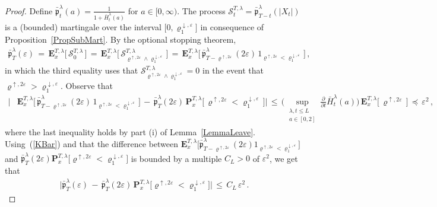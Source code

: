 \documentclass[10pt]{article}
\numberwithin{equation}{section}
\theoremstyle{definition}
\begin{document}
\begin{proof}
Define   $\bar{\mathfrak{p}}_t^{\lambda}(a)=\frac{1}{1+ \bar{H}^{\lambda}_t(a)  }$ for $a\in [0,\infty)$.
  The process $\mathcal{S}^{T,\lambda}_t=\bar{\mathfrak{p}}^{\lambda}_{T-t}(|X_t|)$ is a (bounded)  martingale over the interval $\big[0,\varrho^{\downarrow, \varepsilon}_1 \big]$ in consequence of Proposition~\ref{PropSubMart}.   By the optional stopping theorem,
\begin{align}\label{KBar}
 \bar{\mathfrak{p}}_T^{\lambda}(\varepsilon )  \,=\,  \mathbf{E}^{T,\lambda }_x\Big[\,\mathcal{S}^{T,\lambda}_0\,\Big]\, =\,\mathbf{E}^{T,\lambda }_x\Big[\,\mathcal{S}^{T,\lambda}_{ \varrho^{\uparrow, 2\varepsilon}\wedge \varrho^{\downarrow, \varepsilon}_1  }\,\Big]\,=\,\mathbf{E}^{T,\lambda }_x\Big[\,\bar{\mathfrak{p}}_{T-  \varrho^{\uparrow, 2\varepsilon}}^{\lambda}(2\varepsilon )\, 1_{ \varrho^{\uparrow, 2\varepsilon}<\varrho^{\downarrow, \varepsilon}_1}\, \Big]\,,
\end{align}
in which the third equality uses that $\mathcal{S}^{T,\lambda}_{ \varrho^{\uparrow, 2\varepsilon}\wedge \varrho^{\downarrow, \varepsilon}_1  }=0$ in the event that $\varrho^{\uparrow, 2\varepsilon}>\varrho^{\downarrow, \varepsilon}_1$.  Observe that 
\begin{align*}
    \bigg| & \mathbf{E}^{T,\lambda }_x\Big[\,\bar{\mathfrak{p}}_{T-  \varrho^{\uparrow, 2\varepsilon}}^{\lambda}(2\varepsilon )\,1_{ \varrho^{\uparrow, 2\varepsilon}<\varrho^{\downarrow, \varepsilon}_1}\, \Big] \,-\,  \bar{\mathfrak{p}}_T^{\lambda}(2\varepsilon )\,\mathbf{P}^{T,\lambda }_x\Big[\,\varrho^{\uparrow, 2\varepsilon}<\varrho^{\downarrow, \varepsilon}_1\,\Big] \bigg| \nonumber \,\leq\,\Bigg(\sup_{ \substack{\lambda, t\leq L  \\ a\in [0,2]   }    } \frac{\partial}{\partial t}  \bar{H}^{\lambda}_{t }(a)  \Bigg) \, \mathbf{E}^{T,\lambda }_x\big[\,\varrho^{\uparrow, 2\varepsilon}\,\big]\,\preceq \,\varepsilon^2\,,
\end{align*}
where the last inequality holds by part (i) of Lemma~\ref{LemmaLeave}.  Using~(\ref{KBar}) and that the difference between $\mathbf{E}^{T,\lambda }_x\big[\bar{\mathfrak{p}}_{T-  \varrho^{\uparrow, 2\varepsilon}}^{\lambda}(2\varepsilon )1_{ \varrho^{\uparrow, 2\varepsilon}<\varrho^{\downarrow, \varepsilon}_1} \big]$ and $\bar{\mathfrak{p}}_T^{\lambda}(2\varepsilon )\mathbf{P}^{T,\lambda }_x\big[\varrho^{\uparrow, 2\varepsilon}<\varrho^{\downarrow, \varepsilon}_1\big]$ is bounded by a multiple  $C_L>0$ of $\varepsilon^2$, we get that
\begin{align}\label{K2KDiff}
    \bigg| \bar{\mathfrak{p}}_T^{\lambda}(\varepsilon ) \,-\,\bar{\mathfrak{p}}_T^{\lambda}(2\varepsilon )\,\mathbf{P}^{T,\lambda }_x\Big[\varrho^{\uparrow, 2\varepsilon}<\varrho^{\downarrow, \varepsilon}_1\Big] \bigg| \,\leq \,C_L\,\varepsilon^2\,.

\end{align}
\end{proof}
\end{document}

